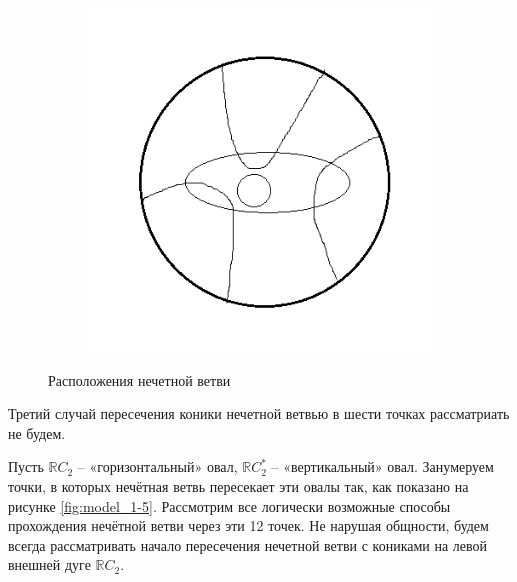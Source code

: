 \documentclass[14pt]{article}
\begin{document}
\begin{figure}[H]
\begin{subfigure}[b]{0.2\textwidth}
    \caption{}
  \end{subfigure}
  \hspace{2cm}
  \begin{subfigure}[b]{0.2\textwidth}
    \centering
    \includegraphics[scale=0.5]{loc_odd_brunch_3.png}
    \caption{}
  \end{subfigure}
\caption{Расположения нечетной ветви}
\label{fig:loc_odd_brunch}
\end{figure}

Третий случай пересечения коники нечетной ветвью в шести точках рассматриать не будем.

Пусть $\mathbb RC_2$ -- «горизонтальный» овал, $\mathbb RC_2^*$ -- «вертикальный» овал. Занумеруем точки, в которых нечётная ветвь пересекает эти овалы так, как показано на рисунке \ref{fig:model_1-5}. Рассмотрим все логически возможные способы прохождения нечётной ветви через эти 12 точек. Не нарушая общности, будем всегда рассматривать начало пересечения нечетной ветви с кониками на левой внешней дуге $\mathbb RC_2$. 
\end{document}
